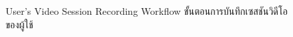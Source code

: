 \begin{figure}[ht]
    \begin{center}
    
    \end{center}
    \newcommand{\MobileAppUserJourner}{\ifenglish User's Video Session Recording Workflow \else ขั้นตอนการบันทึกเซสชันวิดีโอของผู้ใช้ \fi}
    \caption[\MobileAppUserJourner]{\MobileAppUserJourner}
    \label{fig:video session record state diagram}
\end{figure}